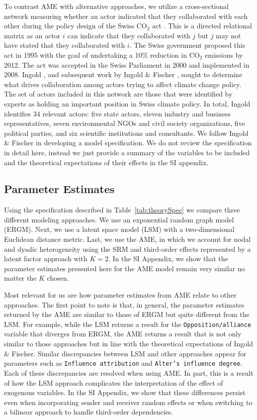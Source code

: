 \documentclass[9pt,twocolumn,twoside,lineno]{pnas-new}
\begin{document}
To contrast AME with alternative approaches, we utilize a cross-sectional network measuring whether an actor indicated that they collaborated with each other during the policy design of the Swiss CO$_{2}$ act \citep{ingold:2008}. This is a directed relational matrix as an actor $i$ can indicate that they collaborated with $j$ but $j$ may not have stated that they collaborated with $i$. The Swiss government proposed this act in 1995 with the goal of undertaking a 10\% reduction in CO$_{2}$ emissions by 2012. The act was accepted in the Swiss Parliament in 2000 and implemented in 2008. Ingold \cite{ingold:2008}, and subsequent work by Ingold \& Fischer \cite{ingold:fischer:2014}, sought to determine what drives collaboration among actors trying to affect climate change policy. The set of actors included in this network are those that were identified by experts as holding an important position in Swiss climate policy. In total, Ingold identifies 34 relevant actors: five state actors, eleven industry and business representatives, seven environmental NGOs and civil society organizations, five political parties, and six scientific institutions and consultants. We follow Ingold \& Fischer in developing a model specification. We do not review the specification in detail here, instead we just provide a summary of the variables to be included and the theoretical expectations of their effects in the SI appendix.

\subsection*{Parameter Estimates}

Using the specification described in Table~\ref{tab:theorySpec} we compare three different modeling approaches. We use an exponential random graph model (ERGM). Next, we use a latent space model (LSM) with a two-dimensional Euclidean distance metric. Last, we use the AME, in which we account for nodal and dyadic heterogeneity using the SRM and third-order effects represented by a latent factor approach with $K=2$. In the SI Appendix, we show that the parameter estimates presented here for the AME model remain very similar no matter the $K$ chosen.

Most relevant for us are how parameter estimates from AME relate to other approaches. The first point to note is that, in general, the parameter estimates returned by the AME are similar to those of ERGM but quite different from the LSM. For example, while the LSM returns a result for the \texttt{Opposition/alliance} variable that diverges from ERGM, the AME returns a result that is not only similar to those approaches but in line with the theoretical expectations of Ingold \& Fischer. Similar discrepancies between LSM and other approaches appear for parameters such as \texttt{Influence attribution} and \texttt{Alter's influence degree}. Each of these discrepancies are resolved when using AME. In part, this is a result of how the LSM approach complicates the interpretation of the effect of exogenous variables. In the SI Appendix, we show that these differences persist even when incorporating sender and receiver random effects or when switching to a bilinear approach to handle third-order dependencies.
\end{document}
